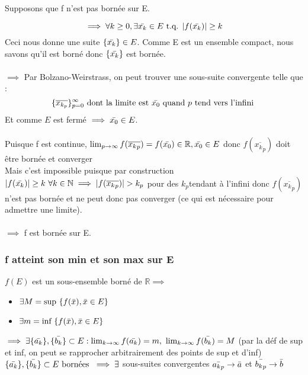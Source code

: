 \documentclass{article}
\begin{document}
Supposons que f n'est pas bornée sur E.

\[ \implies \forall k \geq 0, \exists \Bar{x_k} \in E \text{ t.q. } |f(\Bar{x_k})| \geq k \]
Ceci nous donne une suite $ \{\Bar{x_k}\} \in E $. Comme E est un ensemble compact, nous savons qu'il est borné donc $ \{\Bar{x_k}\} $ est bornée.\\\\
$ \implies $ Par Bolzano-Weirstrass, on peut trouver une sous-suite convergente telle que :
\[ \{ \overline{x_{k_p}}\}_{p = 0}^{\infty} \text{ dont la limite est } \Bar{x_0} \text{ quand $ p $ tend vers l'infini } \]
Et comme $ E $ est fermé $ \implies \Bar{x_0} \in E $.\\\\
Puisque f est continue, $\lim_{p\to\infty} f(\overline{{x_k}_p}) = f(\Bar{x_0}) \in \mathbb{R}, \Bar{x_0} \in E $ donc $f(\overline{{x_k}_p})$ doit être bornée et converger\\
Mais c'est impossible puisque par construction $ |f(\Bar{x_k})| \geq k\ \forall k \in \mathbb{N} \implies |f(\overline{{x_k}_p})| > k_p$ pour des $k_p$tendant à l'infini donc $f(\overline{{x_k}_p}) $ n'est pas bornée et ne peut donc pas converger (ce qui est nécessaire pour admettre une limite).\\\\
$ \implies $ f est bornée sur E.

\subsubsection{f atteint son min et son max sur E}

$ f(E) $ est un sous-ensemble borné de $ \mathbb{R} \implies $
\begin{itemize}
    \item $ \exists M = \text{sup } \{f(\Bar{x}), \Bar{x} \in E \}$
    \item $ \exists m = \text{inf } \{f(\Bar{x}), \Bar{x} \in E \}$
\end{itemize}

$ \implies \exists \{\Bar{a_k}\}, \{\Bar{b_k}\} \subset E : \lim_{k\to\infty} f(\Bar{a_k}) = m,\ \lim_{k\to\infty} f(\Bar{b_k}) = M $ (par la déf de sup et inf, on peut se rapprocher arbitrairement des points de sup et d'inf)\\

$ \{\Bar{a_k}\},\{\Bar{b_k}\} \subset E \text{ bornées } \implies \exists $ sous-suites convergentes $ \Bar{{a_k}_p} \to \Bar{a} $ et $ \Bar{{b_k}_p} \to \Bar{b} $
\end{document}
